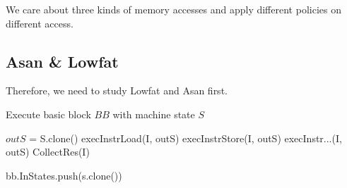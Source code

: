 We care about three kinds of memory accesses and apply different policies on different access.

\subsection{Asan \& Lowfat}
Therefore, we need to study Lowfat and Asan first.






















\begin{algorithm}
  \caption{Execute basic block $BB$ with machine state $S$}
  \footnotesize
  \begin{algorithmic}[1]
    \State $outS$ = S.clone()  
    \State execInstrLoad(I, outS) 
    \EndCase
    \State execInstrStore(I, outS)
    \EndCase
    \State execInstr...(I, outS)
    \EndCase
    \EndSwitch
    \State CollectRes(I) 
    \EndFor

    \State
     
     
    \State bb.InStates.push(s.clone())
    \EndFor
    \EndIf

    \EndFunction
  \end{algorithmic}
\end{algorithm}


